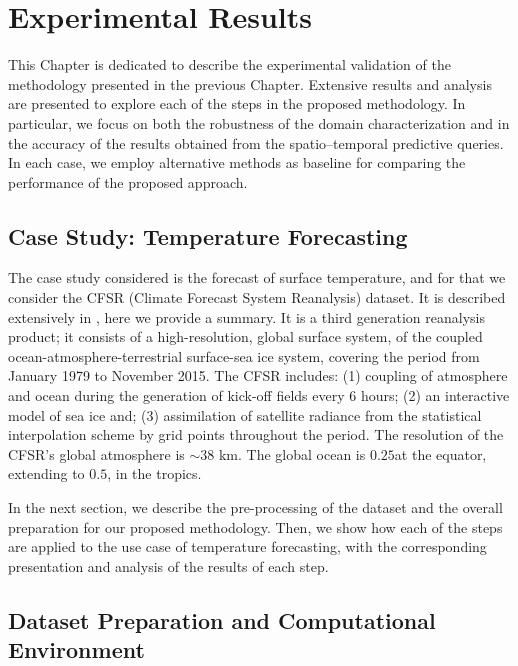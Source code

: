 \chapter{Experimental Results}
\label{chapter_Experimental_Results}

This Chapter is dedicated to describe the experimental validation of the methodology presented in the previous Chapter. Extensive results and analysis are presented to explore each of the steps in the proposed methodology. In particular, we focus on both the robustness of the domain characterization and in the accuracy of the results obtained from the spatio--temporal predictive queries. In each case, we employ alternative methods as baseline for comparing the performance of the proposed approach.


\section{Case Study: Temperature Forecasting}

The case study considered is the forecast of surface temperature, and for that we consider the CFSR (Climate Forecast System Reanalysis) dataset. It is described extensively in \cite{Saha2010}, here we provide a summary. It is a third generation reanalysis product; it consists of a high-resolution, global surface system, of the coupled ocean-atmosphere-terrestrial surface-sea ice system, covering the period from January 1979 to November 2015. The CFSR includes: (1) coupling of atmosphere and ocean during the generation of kick-off fields every 6 hours; (2) an interactive model of sea ice and; (3) assimilation of satellite radiance from the statistical interpolation scheme by grid points throughout the period. The resolution of the CFSR's global atmosphere is $\sim 38$ km. The global ocean is $0.25$\textdegree at the equator, extending to $0.5$\textdegree, in the tropics. 

In the next section, we describe the pre-processing of the dataset and the overall preparation for our proposed methodology. Then, we show how each of the steps are applied to the use case of temperature forecasting, with the corresponding presentation and analysis of the results of each step.

\section{Dataset Preparation and Computational Environment}
\label{sec:DatasetPreparation}

